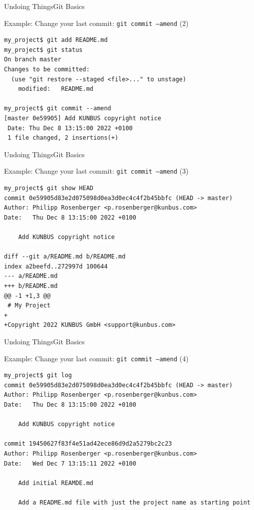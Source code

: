 \documentclass[aspectratio=169]{beamer}
\renewcommand{\footnotesize}{\tiny}
\begin{document}
\begin{frame}[fragile]{Undoing Things}{Git Basics}
\begin{block}{Example: Change your last commit: \texttt{git commit --amend} {\small(2)}}
\begin{verbatim}
my_project$ git add README.md
my_project$ git status 
On branch master
Changes to be committed:
  (use "git restore --staged <file>..." to unstage)
	modified:   README.md

my_project$ git commit --amend
[master 0e59905] Add KUNBUS copyright notice
 Date: Thu Dec 8 13:15:00 2022 +0100
 1 file changed, 2 insertions(+)
\end{verbatim}
\end{block}
\end{frame}

\begin{frame}[fragile]{Undoing Things}{Git Basics}
\begin{block}{Example: Change your last commit: \texttt{git commit --amend} {\small(3)}}
\begin{verbatim}
my_project$ git show HEAD
commit 0e59905d83e2d075098d0ea3d0ec4c4f2b45bbfc (HEAD -> master)
Author: Philipp Rosenberger <p.rosenberger@kunbus.com>
Date:   Thu Dec 8 13:15:00 2022 +0100

    Add KUNBUS copyright notice

diff --git a/README.md b/README.md
index a2beefd..272997d 100644
--- a/README.md
+++ b/README.md
@@ -1 +1,3 @@
 # My Project
+
+Copyright 2022 KUNBUS GmbH <support@kunbus.com>
\end{verbatim}
\end{block}
\end{frame}

\begin{frame}[fragile]{Undoing Things}{Git Basics}
\begin{block}{Example: Change your last commit: \texttt{git commit --amend} {\small(4)}}
\begin{verbatim}
my_project$ git log
commit 0e59905d83e2d075098d0ea3d0ec4c4f2b45bbfc (HEAD -> master)
Author: Philipp Rosenberger <p.rosenberger@kunbus.com>
Date:   Thu Dec 8 13:15:00 2022 +0100

    Add KUNBUS copyright notice

commit 19450627f83f4e51ad42ece86d9d2a5279bc2c23
Author: Philipp Rosenberger <p.rosenberger@kunbus.com>
Date:   Wed Dec 7 13:15:11 2022 +0100

    Add initial REAMDE.md
    
    Add a README.md file with just the project name as starting point
\end{verbatim}
\end{block}
\end{frame}
\end{document}
